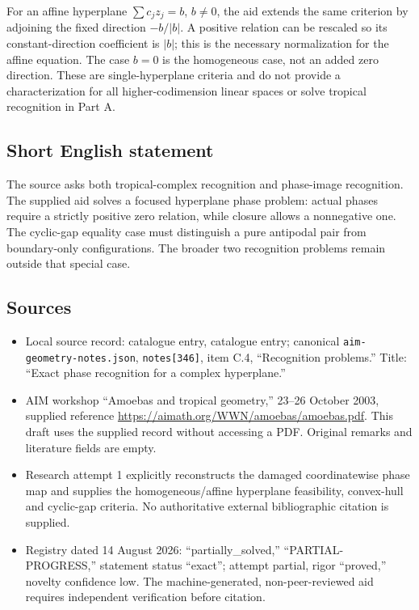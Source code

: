 \documentclass[11pt]{article}
\begin{document}
For an affine hyperplane \(\sum c_jz_j=b\), \(b\ne0\), the aid extends the same criterion by adjoining the fixed direction \(-b/|b|\). A positive relation can be rescaled so its constant-direction coefficient is \(|b|\); this is the necessary normalization for the affine equation. The case \(b=0\) is the homogeneous case, not an added zero direction. These are single-hyperplane criteria and do not provide a characterization for all higher-codimension linear spaces or solve tropical recognition in Part A.
\subsection{Short English statement}
The source asks both tropical-complex recognition and phase-image recognition. The supplied aid solves a focused hyperplane phase problem: actual phases require a strictly positive zero relation, while closure allows a nonnegative one. The cyclic-gap equality case must distinguish a pure antipodal pair from boundary-only configurations. The broader two recognition problems remain outside that special case.
\subsection{Sources}
\begin{itemize}
\item Local source record: catalogue entry, catalogue entry; canonical \texttt{aim-geometry-notes.json}, \texttt{notes[346]}, item C.4, ``Recognition problems.'' Title: ``Exact phase recognition for a complex hyperplane.''
\item AIM workshop ``Amoebas and tropical geometry,'' 23--26 October 2003, supplied reference \url{https://aimath.org/WWN/amoebas/amoebas.pdf}. This draft uses the supplied record without accessing a PDF. Original remarks and literature fields are empty.
\item Research attempt 1 explicitly reconstructs the damaged coordinatewise phase map and supplies the homogeneous/affine hyperplane feasibility, convex-hull and cyclic-gap criteria. No authoritative external bibliographic citation is supplied.
\item Registry dated 14 August 2026: ``partially\_solved,'' ``PARTIAL-PROGRESS,'' statement status ``exact''; attempt partial, rigor ``proved,'' novelty confidence low. The machine-generated, non-peer-reviewed aid requires independent verification before citation.
\end{itemize}
\end{document}
